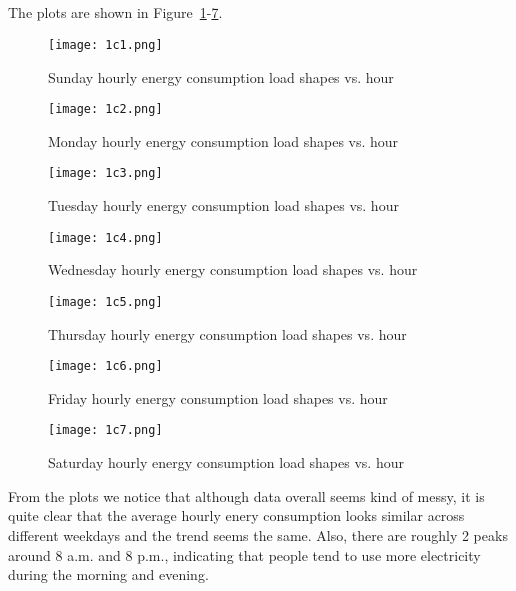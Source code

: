 \documentclass[12pt]{article}
\begin{document}
\subsection{}
The plots are shown in Figure~\ref{fig:1c1}-\ref{fig:1c7}.
\begin{figure}[H]
	\centering
	\texttt{[image: 1c1.png]}
	\vspace{-1cm}      
	\caption{Sunday hourly energy consumption load shapes vs. hour}
	\label{fig:1c1}
\end{figure}
\begin{figure}[H]
	\centering
	\texttt{[image: 1c2.png]}
	\vspace{-1cm}      
	\caption{Monday hourly energy consumption load shapes vs. hour}
	\label{fig:1c2}
\end{figure}
\begin{figure}[H]
	\centering
	\texttt{[image: 1c3.png]}
	\vspace{-1cm}      
	\caption{Tuesday hourly energy consumption load shapes vs. hour}
	\label{fig:1c3}
\end{figure}
\begin{figure}[H]
	\centering
	\texttt{[image: 1c4.png]}
	\vspace{-1cm}      
	\caption{Wednesday hourly energy consumption load shapes vs. hour}
	\label{fig:1c4}
\end{figure}
\begin{figure}[H]
	\centering
	\texttt{[image: 1c5.png]}
	\vspace{-1cm}      
	\caption{Thursday hourly energy consumption load shapes vs. hour}
	\label{fig:1c5}
\end{figure}
\begin{figure}[H]
	\centering
	\texttt{[image: 1c6.png]}
	\vspace{-1cm}      
	\caption{Friday hourly energy consumption load shapes vs. hour}
	\label{fig:1c6}
\end{figure}
\begin{figure}[H]
	\centering
	\texttt{[image: 1c7.png]}
	\vspace{-1cm}      
	\caption{Saturday hourly energy consumption load shapes vs. hour}
	\label{fig:1c7}
\end{figure}
\noindent From the plots we notice that although data overall seems kind of messy, it is quite clear that the average hourly enery consumption looks similar across different weekdays and the trend seems the same. Also, there are roughly 2 peaks around 8 a.m. and 8 p.m., indicating that people tend to use more electricity during the morning and evening.
\newpage
\end{document}
